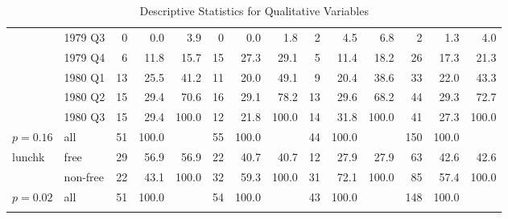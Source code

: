 \documentclass[doc]{apa6}\usepackage[]{graphicx}\usepackage[]{color}
\begin{document}
\begin{landscape}
{\begin{longtable}{ll|rrr|rrr|rrr|rrr}
   & 1979 Q3 & 0 & 0.0 & 3.9 & 0 & 0.0 & 1.8 & 2 & 4.5 & 6.8 & 2 & 1.3 & 4.0 \\ 
   & 1979 Q4 & 6 & 11.8 & 15.7 & 15 & 27.3 & 29.1 & 5 & 11.4 & 18.2 & 26 & 17.3 & 21.3 \\ 
   & 1980 Q1 & 13 & 25.5 & 41.2 & 11 & 20.0 & 49.1 & 9 & 20.4 & 38.6 & 33 & 22.0 & 43.3 \\ 
   & 1980 Q2 & 15 & 29.4 & 70.6 & 16 & 29.1 & 78.2 & 13 & 29.6 & 68.2 & 44 & 29.3 & 72.7 \\ 
   & 1980 Q3 & 15 & 29.4 & 100.0 & 12 & 21.8 & 100.0 & 14 & 31.8 & 100.0 & 41 & 27.3 & 100.0 \\ 
   \hline
$p= 0.16$ & all & 51 & 100.0 &  & 55 & 100.0 &  & 44 & 100.0 &  & 150 & 100.0 &  \\ 
   \hline
\hline
lunchk & free & 29 & 56.9 & 56.9 & 22 & 40.7 & 40.7 & 12 & 27.9 & 27.9 & 63 & 42.6 & 42.6 \\ 
   & non-free & 22 & 43.1 & 100.0 & 32 & 59.3 & 100.0 & 31 & 72.1 & 100.0 & 85 & 57.4 & 100.0 \\ 
   \hline
$p= 0.02$ & all & 51 & 100.0 &  & 54 & 100.0 &  & 43 & 100.0 &  & 148 & 100.0 &  \\ 
   \hline
\hline
\hline
\caption{Descriptive Statistics for Qualitative Variables} 
\label{}
\end{longtable}
}



\end{landscape}
\end{document}
